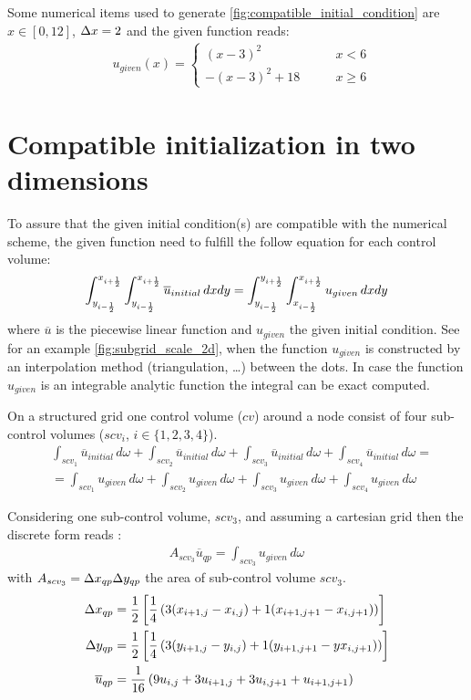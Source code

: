 Some numerical items used to generate \autoref{fig:compatible_initial_condition} are $x \in [0, 12]$, $\Delta x=2$ and the given function reads:
\begin{align}
    &u_{given}(x) =
    \begin{cases}
        (x-3)^2 & \qquad x < 6
        \\
        -(x-3)^2 + 18 & \qquad x \geq 6
    \end{cases}
\end{align}
\section{Compatible initialization in two dimensions}\label{sec:compatible_initialization}
To assure that the given initial condition(s) are compatible with the numerical scheme, the given function need to fulfill the follow equation for each control volume:
\begin{align}
    \int_{y_{i-\frac{1}{2}}}^{x_{i+\frac{1}{2}}} \int_{y_{i-\frac{1}{2}}}^{x_{i+\frac{1}{2}}} \overline u_{initial}\, dxdy = \int_{y_{i-\frac{1}{2}}}^{y_{i+\frac{1}{2}}} \int_{x_{i-\frac{1}{2}}}^{x_{i+\frac{1}{2}}} u_{given}\, dxdy \label{eq:compatible_initialization}
\end{align}
where $\overline{u}$ is the piecewise linear function and $u_{given}$ the given initial condition.
See for an example \autoref{fig:subgrid_scale_2d}, when the function $u_{given}$ is constructed by an interpolation method (triangulation, \ldots) between the dots.
In case the function $u_{given}$ is an integrable analytic function the integral can be exact computed.

On a structured grid one control volume ($cv$) around a node consist of four sub-control volumes ($scv_i$, $i\in\{1,2,3,4\}$).
\begin{align}
    &\int_{scv_1} \overline u_{initial}\, d\omega +
    \int_{scv_2} \overline u_{initial}\, d\omega +
    \int_{scv_3} \overline u_{initial}\, d\omega +
    \int_{scv_4} \overline u_{initial}\, d\omega
    =
    \nonumber \\
    & =\int_{scv_1} u_{given}\, d\omega +
    \int_{scv_2} u_{given}\, d\omega +
    \int_{scv_3} u_{given}\, d\omega +
    \int_{scv_4} u_{given}\, d\omega
\end{align}

Considering one sub-control volume, $scv_3$, and assuming a
cartesian grid then the discrete form reads :
\begin{align}
A_{scv_3} \overline{u}_{qp} = \int_{scv_3} u_{given}\, d\omega
\end{align}
with $A_{scv_3} = \Delta x_{qp}\Delta y_{qp}$ the area of sub-control volume $scv_3$.
\begin{align}
    \Delta x_{qp} & = \frac{1}{2}\left[\frac{1}{4}\left( 3 (x_{i+1,j} - x_{i,j}) + 1 (x_{i+1,j+1} - x_{i,j+1}) \right)\right]
    \\
    \Delta y_{qp} & = \frac{1}{2}\left[\frac{1}{4}\left( 3 (y_{i+1,j} - y_{i,j}) + 1 (y_{i+1,j+1} - yx_{i,j+1}) \right)\right]
    \\
    \overline{u}_{qp} & = \frac{1}{16} \left( 9 u_{i,j} + 3 u_{i+1,j} + 3 u_{i, j+1} + u_{i+1, j+1} \right)
\end{align}

